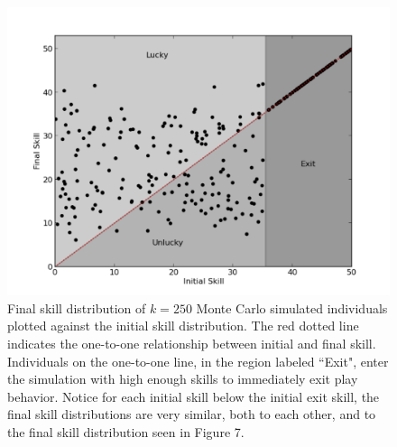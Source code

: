 \documentclass[12pt, letterpaper, fleqn]{article}
\begin{document}
	\clearpage
	\begin{figure}[h!]
	\caption{Final skill distribution of $k=250$ Monte Carlo simulated individuals plotted against the initial skill distribution. The red dotted line indicates the one-to-one relationship between initial and final skill. Individuals on the one-to-one line, in the region labeled ``Exit", enter the simulation with high enough skills to immediately exit play behavior. Notice for each initial skill below the initial exit skill, the final skill distributions are very similar, both to each other, and to the final skill distribution seen in Figure 7. }
	\begin{center}
	\centerline{\includegraphics[width=160mm]{mcmc2.pdf}}
	\end{center}
	\label{mcmc}
	\end{figure}

	
\end{document}
